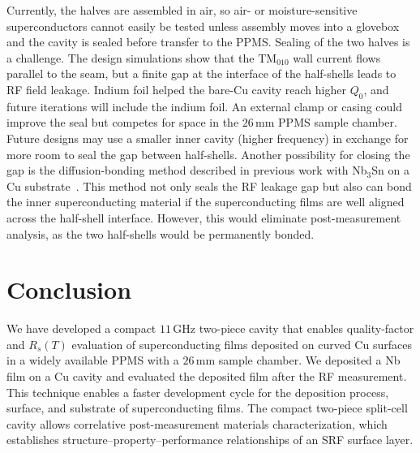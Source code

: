 \documentclass[letterpaper,journal]{IEEEtran}
\newcommand{\SI}[2]{\ensuremath{#1\,\text{#2}}}
\newcommand{\meter}{m}
\newcommand{\hertz}{Hz}
\newcommand{\giga}{G}
\newcommand{\milli}{m}
\begin{document}
Currently, the halves are assembled in air, so air- or moisture-sensitive superconductors cannot easily be tested unless assembly moves into a glovebox and the cavity is sealed before transfer to the PPMS. Sealing of the two halves is a challenge. The design simulations show that the TM$_{010}$ wall current flows parallel to the seam, but a finite gap at the interface of the half-shells leads to RF field leakage. Indium foil helped the bare-Cu cavity reach higher $Q_0$, and future iterations will include the indium foil. An external clamp or casing could improve the seal but competes for space in the \SI{26}{\milli\meter} PPMS sample chamber. Future designs may use a smaller inner cavity (higher frequency) in exchange for more room to seal the gap between half-shells. Another possibility for closing the gap is the diffusion-bonding method described in previous work with Nb$_3$Sn on a Cu substrate~\cite{healing}. This method not only seals the RF leakage gap but also can bond the inner superconducting material if the superconducting films are well aligned across the half-shell interface. However, this would eliminate post-measurement analysis, as the two half-shells would be permanently bonded.


\section{Conclusion}
\label{sec:conclusion}

We have developed a compact \SI{11}{\giga\hertz} two-piece cavity that enables quality-factor and $R_s(T)$ evaluation of superconducting films deposited on curved Cu surfaces in a widely available PPMS with a \SI{26}{\milli\meter} sample chamber. We deposited a Nb film on a Cu cavity and evaluated the deposited film after the RF measurement. 
This technique enables a faster development cycle for the deposition process, surface, and substrate of superconducting films.
The compact two-piece split-cell cavity allows correlative post-measurement materials characterization, which establishes structure--property--performance relationships of an SRF surface layer. 




\end{document}
